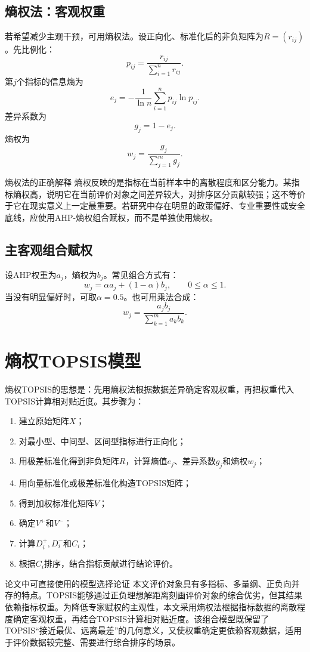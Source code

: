 \documentclass[UTF8,a4paper,12pt,fontset=none]{ctexart}
\begin{document}
\subsection{熵权法：客观权重}
若希望减少主观干预，可用熵权法。设正向化、标准化后的非负矩阵为$R=(r_{ij})$。先比例化：
\[
p_{ij}=\frac{r_{ij}}{\sum_{i=1}^{n}r_{ij}}.
\]
第$j$个指标的信息熵为
\[
e_j=-\frac{1}{\ln n}\sum_{i=1}^{n}p_{ij}\ln p_{ij}.
\]
差异系数为
\[
g_j=1-e_j.
\]
熵权为
\[
w_j=\frac{g_j}{\sum_{j=1}^{m}g_j}.
\]

\begin{warnbox}{熵权法的正确解释}
熵权反映的是指标在当前样本中的离散程度和区分能力。某指标熵权高，说明它在当前评价对象之间差异较大，对排序区分贡献较强；这不等价于它在现实意义上一定最重要。若研究中存在明显的政策偏好、专业重要性或安全底线，应使用AHP-熵权组合赋权，而不是单独使用熵权。
\end{warnbox}

\subsection{主客观组合赋权}
设AHP权重为$a_j$，熵权为$b_j$。常见组合方式有：
\[
w_j=\alpha a_j+(1-\alpha)b_j,\qquad 0\le \alpha\le1.
\]
当没有明显偏好时，可取$\alpha=0.5$。也可用乘法合成：
\[
w_j=\frac{a_jb_j}{\sum_{k=1}^{m}a_kb_k}.
\]

\section{熵权TOPSIS模型}

熵权TOPSIS的思想是：先用熵权法根据数据差异确定客观权重，再把权重代入TOPSIS计算相对贴近度。其步骤为：
\begin{enumerate}[leftmargin=2em]
  \item 建立原始矩阵$X$；
  \item 对最小型、中间型、区间型指标进行正向化；
  \item 用极差标准化得到非负矩阵$R$，计算熵值$e_j$、差异系数$g_j$和熵权$w_j$；
  \item 用向量标准化或极差标准化构造TOPSIS矩阵；
  \item 得到加权标准化矩阵$V$；
  \item 确定$V^+$和$V^-$；
  \item 计算$D_i^+,D_i^-$和$C_i$；
  \item 根据$C_i$排序，结合指标贡献进行结论评价。
\end{enumerate}

\begin{paperbox}{论文中可直接使用的模型选择论证}
本文评价对象具有多指标、多量纲、正负向并存的特点。TOPSIS能够通过正负理想解距离刻画评价对象的综合优劣，但其结果依赖指标权重。为降低专家赋权的主观性，本文采用熵权法根据指标数据的离散程度确定客观权重，再结合TOPSIS计算相对贴近度。该组合模型既保留了TOPSIS“接近最优、远离最差”的几何意义，又使权重确定更依赖客观数据，适用于评价数据较完整、需要进行综合排序的场景。
\end{paperbox}
\end{document}
